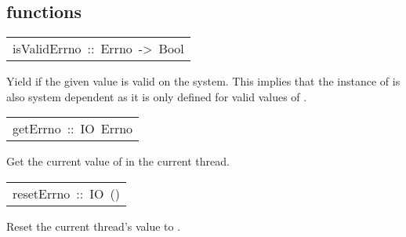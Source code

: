 \subsection{ functions
}
\begin{haddockdesc}
\item[\begin{tabular}{@{}l}
isValidErrno\ ::\ Errno\ ->\ Bool
\end{tabular}]\haddockbegindoc
Yield  if the given  value is valid on the system.
 This implies that the  instance of  is also system dependent
 as it is only defined for valid values of .
\par

\end{haddockdesc}
\begin{haddockdesc}
\item[\begin{tabular}{@{}l}
getErrno\ ::\ IO\ Errno
\end{tabular}]\haddockbegindoc
Get the current value of  in the current thread.
\par

\end{haddockdesc}
\begin{haddockdesc}
\item[\begin{tabular}{@{}l}
resetErrno\ ::\ IO\ ()
\end{tabular}]\haddockbegindoc
Reset the current thread's  value to .
\par

\end{haddockdesc}
